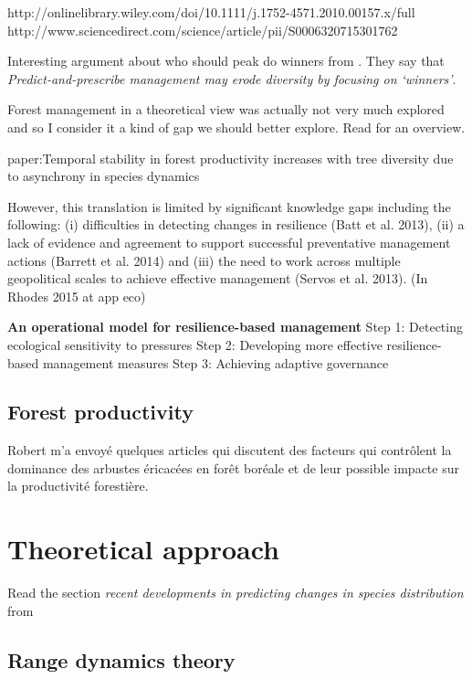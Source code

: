 http://onlinelibrary.wiley.com/doi/10.1111/j.1752-4571.2010.00157.x/full \\
http://www.sciencedirect.com/science/article/pii/S0006320715301762

Interesting argument about who should peak do winners from \citet{Webster2017}. They say that \textit{Predict-and-prescribe management may erode diversity by focusing on ‘winners’}.

Forest management in a theoretical view was actually not very much explored and so I consider it a kind of gap we should better explore. Read \citet{Becknell2015} for an overview.

paper:Temporal stability in forest productivity increases with tree diversity due to asynchrony in species dynamics

However, this translation is limited by significant knowledge gaps including the following: (i) difficulties in detecting changes in resilience (Batt et al. 2013), (ii) a lack of evidence and agreement to support successful preventative management actions (Barrett et al. 2014) and (iii) the need to work across multiple geopolitical scales to achieve effective management (Servos et al. 2013). (In Rhodes 2015 at app eco)

\textbf{An operational model for resilience-based management}
Step 1: Detecting ecological sensitivity to pressures
Step 2: Developing more effective resilience-based management measures
Step 3: Achieving adaptive governance

\subsection{Forest productivity}
Robert m'a envoyé quelques articles qui discutent des facteurs qui contrôlent la dominance des arbustes éricacées en forêt boréale et de leur possible impacte sur la productivité forestière.

\section{Theoretical approach}\label{ta}

Read the section \textit{recent developments in predicting changes in species distribution} from \citet{Ehrlen2015}

\subsection{Range dynamics theory}

